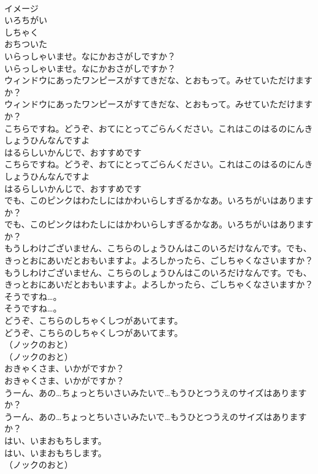 \documentclass[8pt]{extreport}
\begin{document}
\begin{CJK}{UTF8}{min}
\\	イメージ
\\	いろちがい
\\	しちゃく
\\	おちついた
\\	いらっしゃいませ。なにかおさがしですか？
\\	いらっしゃいませ。なにかおさがしですか？
\\	ウィンドウにあったワンピースがすてきだな、とおもって。みせていただけますか？
\\	ウィンドウにあったワンピースがすてきだな、とおもって。みせていただけますか？
\\	こちらですね。どうぞ、おてにとってごらんください。これはこのはるのにんきしょうひんなんですよ
\\	はるらしいかんじで、おすすめです
\\	こちらですね。どうぞ、おてにとってごらんください。これはこのはるのにんきしょうひんなんですよ
\\	はるらしいかんじで、おすすめです
\\	でも、このピンクはわたしにはかわいらしすぎるかなあ。いろちがいはありますか？
\\	でも、このピンクはわたしにはかわいらしすぎるかなあ。いろちがいはありますか？
\\	もうしわけございません、こちらのしょうひんはこのいろだけなんです。でも、きっとおにあいだとおもいますよ。よろしかったら、ごしちゃくなさいますか？
\\	もうしわけございません、こちらのしょうひんはこのいろだけなんです。でも、きっとおにあいだとおもいますよ。よろしかったら、ごしちゃくなさいますか？
\\	そうですね…。
\\	そうですね…。
\\	どうぞ、こちらのしちゃくしつがあいてます。
\\	どうぞ、こちらのしちゃくしつがあいてます。
\\	（ノックのおと）
\\	（ノックのおと）
\\	おきゃくさま、いかがですか？
\\	おきゃくさま、いかがですか？
\\	うーん、あの…ちょっとちいさいみたいで…もうひとつうえのサイズはありますか？
\\	うーん、あの…ちょっとちいさいみたいで…もうひとつうえのサイズはありますか？
\\	はい、いまおもちします。
\\	はい、いまおもちします。
\\	（ノックのおと）

\end{CJK}
\end{document}

